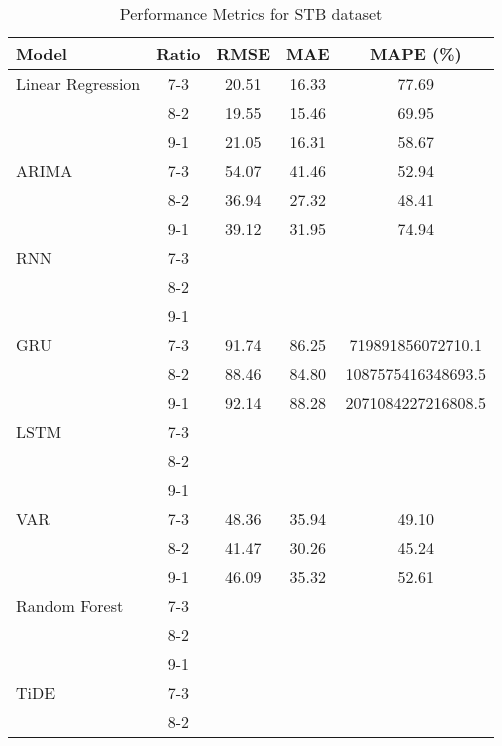\begin{table}[h!]
    \centering
    \caption{Performance Metrics for STB dataset}
    \begin{tabular}{|l|c|c|c|c|}
    \hline
    \rowcolor{orange!30} \textbf{Model} & \textbf{Ratio} & \textbf{RMSE} & \textbf{MAE} & \textbf{MAPE (\%)} \\ \hline
    \rowcolor{white} Linear Regression & 7-3 & 20.51 & 16.33 & 77.69 \\ \hline
    \rowcolor{white}  & 8-2 & 19.55 & 15.46 & 69.95 \\ \hline
    \rowcolor{white}  & 9-1 & 21.05 & 16.31 & 58.67 \\ \hline
    \rowcolor{white} ARIMA & 7-3 & 54.07 & 41.46 & 52.94 \\ \hline
    \rowcolor{white}  & 8-2 & 36.94 & 27.32 & 48.41 \\ \hline
    \rowcolor{white}  & 9-1 & 39.12 & 31.95 & 74.94 \\ \hline
    \rowcolor{white} RNN & 7-3 &  &  &  \\ \hline
    \rowcolor{white}  & 8-2 &  &  &  \\ \hline
    \rowcolor{white}  & 9-1 &  &  &  \\ \hline
    \rowcolor{white} GRU & 7-3 & 91.74 & 86.25 & 719891856072710.1 \\ \hline
    \rowcolor{white}  & 8-2 & 88.46 & 84.80 &  1087575416348693.5 \\ \hline
    \rowcolor{white}  & 9-1 & 92.14 & 88.28 & 2071084227216808.5 \\ \hline
    \rowcolor{white} LSTM & 7-3 &  &  &  \\ \hline
    \rowcolor{white}  & 8-2 &  &  &  \\ \hline
    \rowcolor{white}  & 9-1 &  &  &  \\ \hline
    \rowcolor{white} VAR & 7-3 & 48.36 & 35.94 & 49.10 \\ \hline
    \rowcolor{white}  & 8-2 & 41.47 & 30.26 & 45.24 \\ \hline
    \rowcolor{white}  & 9-1 & 46.09 & 35.32 & 52.61 \\ \hline
    \rowcolor{white} Random Forest & 7-3 &  &  &  \\ \hline
    \rowcolor{white}  & 8-2 &  &  &  \\ \hline
    \rowcolor{white}  & 9-1 &  &  &  \\ \hline
    \rowcolor{green!30} TiDE & 7-3 &  &  &  \\ \hline
    \rowcolor{green!30}  & 8-2 &  &  &  \\ \hline

\end{tabular}
\end{table}
